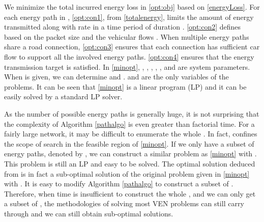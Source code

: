 \documentclass[journal]{IEEEtran}
\begin{document}
We minimize the total incurred energy loss in \eqref{opt:obj} based on \eqref{energyLoss}. For each energy path  in , \eqref{opt:con1}, from \eqref{totalenergy}, limits the amount of energy transmitted along   with rate  in a time period of duration . \eqref{opt:con2} defines  based on the packet size  and the vehicular flows . When multiple energy paths share a road connection, \eqref{opt:con3} ensures that each connection has sufficient car flow to support all the involved energy paths. \eqref{opt:con4} ensures that the energy transmission target is satisfied. In \eqref{minopt}, , , , , , and  are system parameters. When  is given, we can determine  and .  and  are the only variables of the problems. It can be seen that \eqref{minopt} is a linear program (LP) and it can be easily solved by a standard LP solver.

As the number of possible energy paths is generally huge, it is not surprising that the complexity of Algorithm \ref{pathalgo} is even greater than factorial time. For a fairly large network, it may be difficult to enumerate the whole . In fact,  confines the scope of search in the feasible region of \eqref{minopt}. If we only have a subset of energy paths, denoted by , we can construct a similar problem as \eqref{minopt} with . This problem is still an LP and easy to be solved. The optimal solution deduced from  is in fact a sub-optimal solution of the original problem given in \eqref{minopt} with . 
It is easy to modify Algorithm \ref{pathalgo} to construct a subset of .
Therefore, when time is insufficient to construct the whole , and we can only get a subset of , the methodologies of solving most VEN problems can still carry through and we can still obtain sub-optimal solutions.
\end{document}

